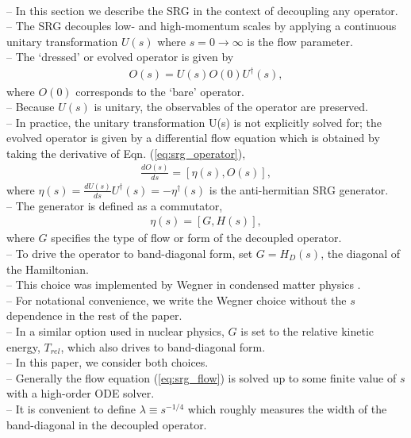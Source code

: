 \documentclass[preprintnumbers,floatfix,aps,prc,preprint,nofootinbib]{revtex4-1}
\begin{document}
\\
-- In this section we describe the SRG in the context of decoupling any operator.
\\
-- The SRG decouples low- and high-momentum scales by applying a continuous unitary transformation $U(s)$ where $s=0 \rightarrow \infty$ is the flow parameter.
\\
-- The `dressed' or evolved operator is given by
%
\begin{eqnarray}
	\label{eq:srg_operator}
	O(s) = U(s) O(0) U^{\dagger}(s),
\end{eqnarray}
%
where $O(0)$ corresponds to the `bare' operator.
\\
-- Because $U(s)$ is unitary, the observables of the operator are preserved.
\\
-- In practice, the unitary transformation U(s) is not explicitly solved for; the evolved operator is given by a differential flow equation which is obtained by taking the derivative of Eqn. (\ref{eq:srg_operator}),
%
\begin{eqnarray}
	\label{eq:srg_flow}
	\frac{dO(s)}{ds} = [\eta(s), O(s)],
\end{eqnarray}
%
where $\eta(s)=\frac{dU(s)}{ds} U^{\dagger}(s) = -\eta^{\dagger}(s)$ is the anti-hermitian SRG generator.
\\
-- The generator is defined as a commutator,
%
\begin{eqnarray}
	\label{eq:srg_generator}
	\eta(s) = [G, H(s)],
\end{eqnarray}
%
where $G$ specifies the type of flow or form of the decoupled operator.
\\
-- To drive the operator to band-diagonal form, set $G=H_D(s)$, the diagonal of the Hamiltonian.
\\
-- This choice was implemented by Wegner in condensed matter physics \cite{Wegner:1994ab}.
\\
-- For notational convenience, we write the Wegner choice without the $s$ dependence in the rest of the paper.
\\
-- In a similar option used in nuclear physics, $G$ is set to the relative kinetic energy, $T_{rel}$, which also drives to band-diagonal form.
\\
-- In this paper, we consider both choices.
\\
-- Generally the flow equation (\ref{eq:srg_flow}) is solved up to some finite value of $s$ with a high-order ODE solver.
\\
-- It is convenient to define $\lambda \equiv s^{-1/4}$ which roughly measures the width of the band-diagonal in the decoupled operator.
\\
\end{document}
